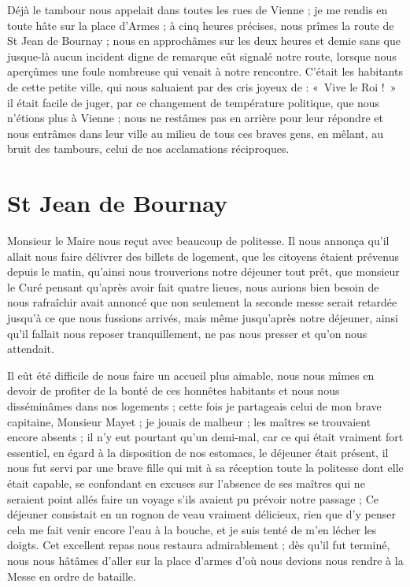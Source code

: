 \documentclass[11pt,a4paper]{report}
\begin{document}
Déjà le tambour nous appelait dans toutes les rues de Vienne ; je me rendis en toute hâte sur la place d'Armes ; à cinq heures précises, nous prîmes la route de St Jean de Bournay ; nous en approchâmes sur les deux heures et demie sans que jusque-là aucun incident digne de remarque eût signalé notre route, lorsque nous aperçûmes une foule nombreuse qui venait à notre rencontre. C'était les habitants de cette petite ville, qui nous saluaient par des cris joyeux de : «~Vive le Roi !~» il était facile de juger, par ce changement de température politique, que nous n'étions plus à Vienne ; nous ne restâmes pas en arrière pour leur répondre et nous entrâmes dans leur ville au milieu de tous ces braves gens, en mêlant, au bruit des tambours, celui de nos acclamations réciproques.

\section*{St Jean de Bournay}

Monsieur le Maire nous reçut avec beaucoup de politesse. Il nous annonça qu'il allait nous faire délivrer des billets de logement, que les citoyens étaient prévenus depuis le matin, qu'ainsi nous trouverions notre déjeuner tout prêt, que monsieur le Curé pensant qu'après avoir fait quatre lieues, nous aurions bien besoin de nous rafraîchir avait annoncé que non seulement la seconde messe serait retardée jusqu'à ce que nous fussions arrivés, mais même jusqu'après notre déjeuner, ainsi qu'il fallait nous reposer tranquillement, ne pas nous presser et qu'on nous attendait.

Il eût été difficile de nous faire un accueil plus aimable, nous nous mîmes en devoir de profiter de la bonté de ces honnêtes habitants et nous nous disséminâmes dans nos logements ; cette fois je partageais celui de mon brave capitaine, Monsieur Mayet ; je jouais de malheur ; les maîtres se trouvaient encore absents ; il n'y eut pourtant qu'un demi-mal, car ce qui était vraiment fort essentiel, en égard à la disposition de nos estomacs, le déjeuner était présent, il nous fut servi par une brave fille qui mit à sa réception toute la politesse dont elle était capable, se confondant en excuses sur l'absence de ses maîtres qui ne seraient point allés faire un voyage s'ils avaient pu prévoir notre passage ; Ce déjeuner consistait en un rognon de veau vraiment délicieux, rien que d'y penser cela me fait venir encore l'eau à la bouche, et je suis tenté de m'en lécher les doigts. Cet excellent repas nous restaura admirablement ; dès qu'il fut terminé, nous nous hâtâmes d'aller sur la place d'armes d'où nous devions nous rendre à la Messe en ordre de bataille.
\end{document}
